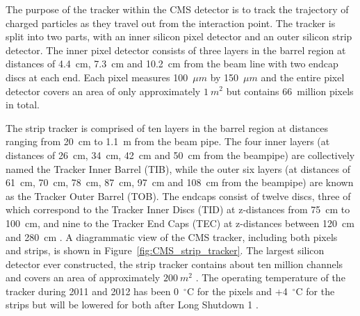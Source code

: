 The purpose of the tracker within the CMS detector is to track the trajectory of charged particles as they
travel out from the interaction point. The tracker is split into two parts, with an inner silicon pixel
detector and an outer silicon strip detector. The inner pixel detector consists of three layers in the
barrel region at distances of 4.4~cm, 7.3~cm and 10.2~cm from the beam line with two endcap discs at each end.
Each pixel measures 100~$\mu m$ by 150~$\mu m$ and the entire pixel detector covers an area of only
approximately $1~m^{2}$ but contains 66~million pixels in total.

The strip tracker is comprised of ten layers in the barrel region at distances ranging from 20~cm to 1.1~m
from the beam pipe. The four inner layers (at distances of 26~cm, 34~cm, 42~cm and 50~cm from the beampipe)
are collectively named the Tracker Inner Barrel (TIB), while the outer six layers (at distances of 61~cm,
70~cm, 78~cm, 87~cm, 97~cm and 108~cm from the beampipe) are known as the Tracker Outer Barrel (TOB). The
endcaps consist of twelve discs, three of which correspond to the Tracker Inner Discs (TID) at z-distances
from 75~cm to 100~cm, and nine to the Tracker End Caps (TEC) at z-distances between 120~cm and 280~cm
\cite{Palmonari:1260970}. A diagrammatic view of the CMS tracker, including both pixels and strips, is shown
in Figure~\ref{fig:CMS_strip_tracker}. The largest silicon detector ever constructed, the strip tracker
contains about ten million channels and covers an area of approximately $200~m^{2}$
\cite{CMS_experiment,CMS_TDR1}. The operating temperature of the tracker during 2011 and 2012 has been
0~$^{\circ}$C for the pixels and +4~$^{\circ}$C for the strips but will be lowered for both after Long
Shutdown 1 \cite{Butz:1497745}.

